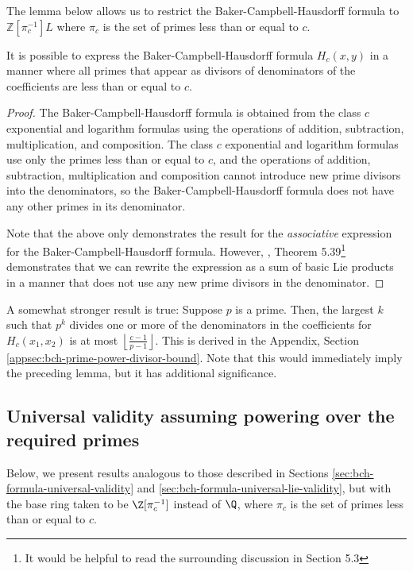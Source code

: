 \documentclass{ucetd}
\begin{document}
The lemma below allows us to restrict the Baker-Campbell-Hausdorff
formula to $\mathbb{Z}[\pi_c^{-1}]L$ where $\pi_c$ is the set of primes
less than or equal to $c$.

\begin{lemma}\label{lemma:bch-primes-in-denominators}
  It is possible to express the Baker-Campbell-Hausdorff formula
  $H_c(x,y)$ in a manner where all primes that appear as divisors of
  denominators of the coefficients are less than or equal
  to $c$.
\end{lemma}

\begin{proof}
  The Baker-Campbell-Hausdorff formula is obtained from the class $c$
  exponential and logarithm formulas using the operations of addition,
  subtraction, multiplication, and composition. The class $c$
  exponential and logarithm formulas use only the primes less than or
  equal to $c$, and the operations of addition, subtraction,
  multiplication and composition cannot introduce new prime divisors
  into the denominators, so the Baker-Campbell-Hausdorff formula does
  not have any other primes in its denominator.

  Note that the above only demonstrates the result for the {\em
    associative} expression for the Baker-Campbell-Hausdorff
  formula. However, \cite{Khukhro}, Theorem 5.39\footnote{It would be
    helpful to read the surrounding discussion in Section 5.3}
  demonstrates that we can rewrite the expression as a sum of basic
  Lie products in a manner that does not use any new prime divisors
  in the denominator.
\end{proof}

A somewhat stronger result is true: Suppose $p$ is a prime. Then, the
largest $k$ such that $p^k$ divides one or more of the denominators in
the coefficients for $H_c(x_1,x_2)$ is at most $\left \lfloor \frac{c
  - 1}{p - 1}\right \rfloor$. This is derived in the Appendix, Section
\ref{appsec:bch-prime-power-divisor-bound}. Note that this would
immediately imply the preceding lemma, but it has additional
significance.

\subsection{Universal validity assuming powering over the required primes}

Below, we present results analogous to those described in Sections
\ref{sec:bch-formula-universal-validity} and
\ref{sec:bch-formula-universal-lie-validity}, but with the base ring
taken to be $\Z[\pi_c^{-1}]$ instead of $\Q$, where $\pi_c$ is the set of
primes less than or equal to $c$.
\end{document}
